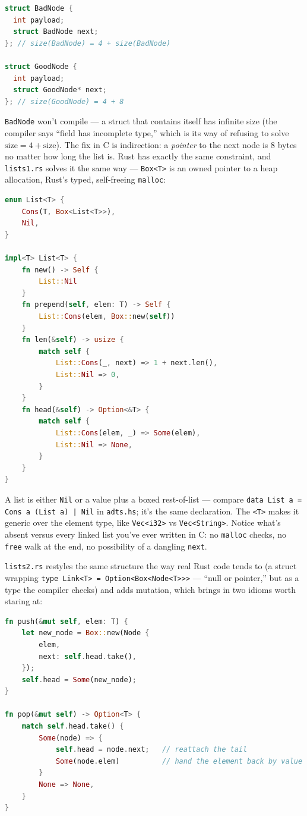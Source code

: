 \documentclass[11pt]{article}
\begin{document}
\begin{lstlisting}[language=C]
struct BadNode {
  int payload;
  struct BadNode next;
}; // size(BadNode) = 4 + size(BadNode)

struct GoodNode {
  int payload;
  struct GoodNode* next;
}; // size(GoodNode) = 4 + 8
\end{lstlisting}

\texttt{BadNode} won't compile --- a struct that contains itself has
infinite size (the compiler says ``field has incomplete type,''
which is its way of refusing to solve
$\mathrm{size} = 4 + \mathrm{size}$). The fix in C is indirection: a
\emph{pointer} to the next node is 8 bytes no matter how long the
list is. Rust has exactly the same constraint, and \texttt{lists1.rs}
solves it the same way --- \texttt{Box<T>} is an owned pointer to a
heap allocation, Rust's typed, self-freeing \texttt{malloc}:

\begin{lstlisting}[language=Rust]
enum List<T> {
    Cons(T, Box<List<T>>),
    Nil,
}

impl<T> List<T> {
    fn new() -> Self {
        List::Nil
    }
    fn prepend(self, elem: T) -> Self {
        List::Cons(elem, Box::new(self))
    }
    fn len(&self) -> usize {
        match self {
            List::Cons(_, next) => 1 + next.len(),
            List::Nil => 0,
        }
    }
    fn head(&self) -> Option<&T> {
        match self {
            List::Cons(elem, _) => Some(elem),
            List::Nil => None,
        }
    }
}
\end{lstlisting}

A list is either \texttt{Nil} or a value plus a boxed rest-of-list
--- compare \texttt{data List a = Cons a (List a) | Nil} in
\texttt{adts.hs}; it's the same declaration. The \texttt{<T>} makes
it generic over the element type, like \texttt{Vec<i32>} vs
\texttt{Vec<String>}. Notice what's absent versus every linked list
you've ever written in C: no \texttt{malloc} checks, no
\texttt{free} walk at the end, no possibility of a dangling
\texttt{next}.

\texttt{lists2.rs} restyles the same structure the way real Rust
code tends to (a struct wrapping \texttt{type Link<T> =
Option<Box<Node<T>>>} --- ``null or pointer,'' but as a type the
compiler checks) and adds mutation, which brings in two idioms worth
staring at:

\begin{lstlisting}[language=Rust]
fn push(&mut self, elem: T) {
    let new_node = Box::new(Node {
        elem,
        next: self.head.take(),
    });
    self.head = Some(new_node);
}

fn pop(&mut self) -> Option<T> {
    match self.head.take() {
        Some(node) => {
            self.head = node.next;   // reattach the tail
            Some(node.elem)          // hand the element back by value
        }
        None => None,
    }
}
\end{lstlisting}
\end{document}
